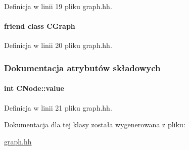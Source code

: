 Definicja w linii 19 pliku graph.\+hh.

\hypertarget{class_c_node_a5ba04087b017dfeadb708ba91d6daf1b}{}
\paragraph[{C\+Graph}]{\setlength{\rightskip}{0pt plus 5cm}friend class {\bf C\+Graph}\hspace{0.3cm}{\ttfamily [friend]}}\label{class_c_node_a5ba04087b017dfeadb708ba91d6daf1b}


Definicja w linii 20 pliku graph.\+hh.



\subsubsection{Dokumentacja atrybutów składowych}
\hypertarget{class_c_node_ad08aa99402f6cfbbb9d9580d1f001441}{}
\paragraph[{value}]{\setlength{\rightskip}{0pt plus 5cm}int C\+Node\+::value\hspace{0.3cm}{\ttfamily [private]}}\label{class_c_node_ad08aa99402f6cfbbb9d9580d1f001441}


Definicja w linii 21 pliku graph.\+hh.



Dokumentacja dla tej klasy została wygenerowana z pliku\+:\begin{DoxyCompactItemize}
\item 
\hyperlink{graph_8hh}{graph.\+hh}\end{DoxyCompactItemize}
